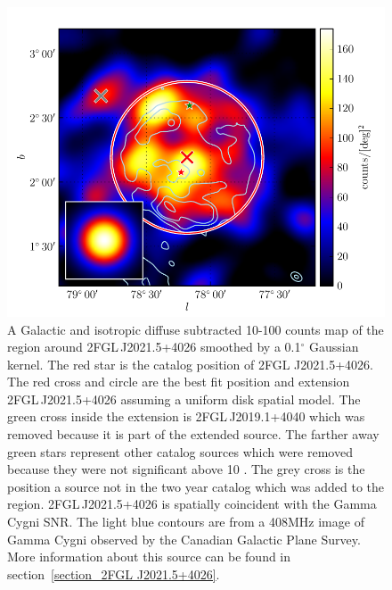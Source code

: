 \documentclass[12pt,preprint]{aastex}
\newcommand{\gev}{\text{GeV}\xspace}
\renewcommand{\deg}{\ensuremath{^\circ}\xspace}
\begin{document}
\begin{figure}
  \begin{center}
    \includegraphics[type=pdf,ext=.pdf,read=.pdf]{source_plots/source_Gamma_Cygni}
  \end{center}
  \caption{A Galactic and isotropic diffuse subtracted 10-100
  \gev counts map of the region around 2FGL\,J2021.5+4026 smoothed by a
  0.1\deg Gaussian kernel. The red star is the catalog position of 2FGL
  J2021.5+4026.  The red cross and circle are the best fit position and
  extension 2FGL\,J2021.5+4026 assuming a uniform disk spatial model.
  The green cross inside the extension is 2FGL\,J2019.1+4040 which
  was removed because it is part of the extended source.  The farther
  away green stars represent other catalog sources which were removed
  because they were not significant above 10 \gev.  The grey cross is
  the position a source not in the two year catalog which was added
  to the region. 2FGL\,J2021.5+4026 is spatially coincident with the
  Gamma Cygni SNR.  The light blue contours are from a 408MHz image of Gamma Cygni
  observed by the Canadian Galactic Plane Survey.  More information about
  this source can be found in section~\ref{section_2FGL J2021.5+4026}.
  }\label{1FGL_J2020.0+4049}
\end{figure}
\end{document}
